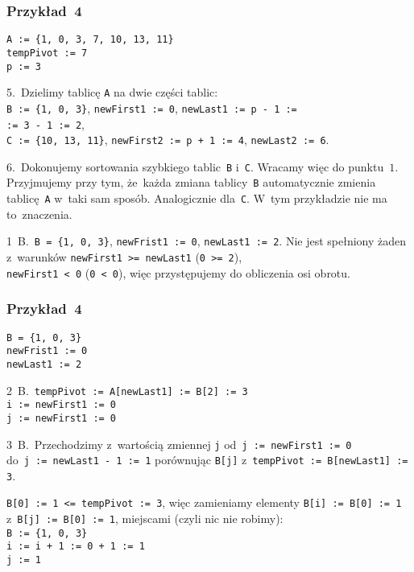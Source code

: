 \documentclass[10pt,t]{beamer}
\begin{document}
\begin{frame}
  \frametitle{Przykład~4}


  \texttt{A := \{1, 0, 3, 7, 10, 13, 11\}} \\
  \texttt{tempPivot := 7} \\
  \texttt{p := 3}

  5.~Dzielimy tablicę \texttt{A} na dwie części tablic: \\
  \texttt{B := \{1, 0, 3\}}, \texttt{newFirst1 := 0},
  \texttt{newLast1 := p - 1 :=} \\
  \texttt{:= 3 - 1 := 2}, \\
  \texttt{C := \{10, 13, 11\}}, \texttt{newFirst2 := p + 1 := 4},
  \texttt{newLast2 := 6}.

  6.~Dokonujemy sortowania szybkiego tablic~\texttt{B} i~\texttt{C}.
  Wracamy więc do punktu~$1$. Przyjmujemy przy tym, że~każda zmiana
  tablicy~\texttt{B} automatycznie zmienia tablicę~\texttt{A} w~taki
  sam sposób. Analogicznie dla~\texttt{C}. W~tym przykładzie nie ma
  to~znaczenia.

  1~B.~\texttt{B = \{1, 0, 3\}}, \texttt{newFrist1 := 0},
  \texttt{newLast1 := 2}. Nie jest spełniony żaden z~warunków
  \texttt{newFirst1 >= newLast1} (\texttt{0 >= 2}), \\
  \texttt{newFirst1 < 0} (\texttt{0 < 0}), więc przystępujemy do obliczenia
  osi obrotu.

\end{frame}





\begin{frame}
  \frametitle{Przykład~4}


  \texttt{B = \{1, 0, 3\}} \\
  \texttt{newFrist1 := 0} \\
  \texttt{newLast1 := 2}

  2~B.~\texttt{tempPivot := A[newLast1] := B[2] := 3} \\
  \texttt{i := newFirst1 := 0} \\
  \texttt{j := newFirst1 := 0}

  3~B.~Przechodzimy z~wartością zmiennej \texttt{j}
  od~\texttt{j := newFirst1 := 0} \\
  do~\texttt{j := newLast1 - 1 := 1} porównując \texttt{B[j]}
  z~\texttt{tempPivot := B[newLast1] := 3}.

  \texttt{B[0] := 1 <= tempPivot := 3}, więc zamieniamy elementy
  \texttt{B[i] := B[0] := 1} z~\texttt{B[j] := B[0] := 1},
   miejscami (czyli nic nie robimy): \\
  \texttt{B := \{1, 0, 3\} } \\
  \texttt{i := i + 1 := 0 + 1 := 1} \\
  \texttt{j := 1}

\end{frame}
\end{document}
